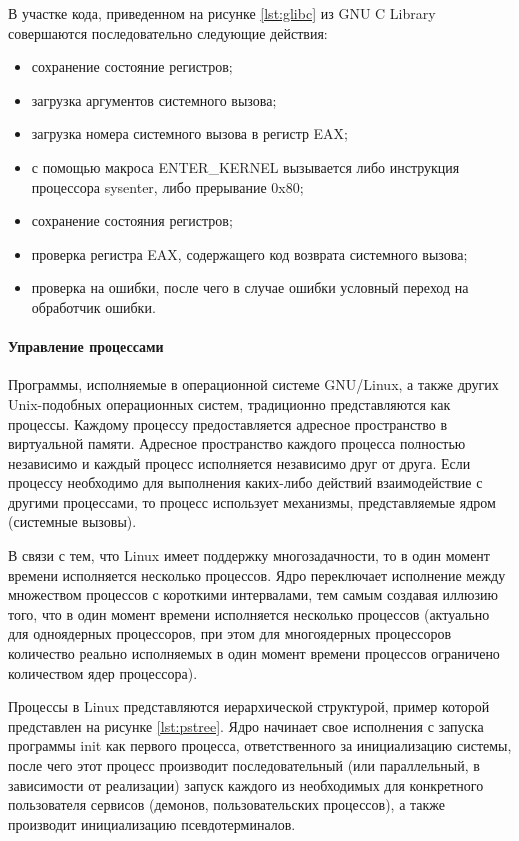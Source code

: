 \documentclass{gost7.32-2001}
\begin{document}
В участке кода, приведенном на рисунке \ref{lst:glibc} из GNU C
Library совершаются последовательно следующие действия:
\begin{itemize}
\item
  сохранение состояние регистров;
\item
  загрузка аргументов системного вызова;
\item
  загрузка номера системного вызова в регистр EAX;
\item
  с помощью макроса ENTER\_KERNEL вызывается либо инструкция процессора sysenter, либо прерывание
  0x80;
\item
  сохранение состояния регистров;
\item
  проверка регистра EAX, содержащего код возврата системного вызова;
\item
  проверка на ошибки, после чего в случае ошибки условный переход на
  обработчик ошибки.
\end{itemize}

\paragraph{Управление процессами}

Программы, исполняемые в
операционной системе GNU/Linux, а также других Unix-подобных
операционных систем, традиционно представляются как процессы. Каждому
процессу предоставляется адресное пространство в виртуальной
памяти. Адресное пространство каждого процесса полностью независимо и
каждый процесс исполняется независимо друг от друга. Если процессу
необходимо для выполнения каких-либо действий взаимодействие с другими
процессами, то процесс использует механизмы, представляемые ядром
(системные вызовы).

В связи с тем, что Linux имеет поддержку многозадачности, то в один
момент времени исполняется несколько процессов. Ядро переключает
исполнение между множеством процессов с короткими интервалами, тем
самым создавая иллюзию того, что в один момент времени исполняется
несколько процессов (актуально для одноядерных процессоров, при этом
для многоядерных процессоров количество реально исполняемых в один
момент времени процессов ограничено количеством ядер процессора).

Процессы в Linux представляются иерархической структурой, пример
которой представлен на рисунке \ref{lst:pstree}. Ядро начинает свое
исполнения с запуска программы init как первого процесса,
ответственного за инициализацию системы, после чего этот процесс
производит последовательный (или параллельный, в зависимости от
реализации) запуск каждого из необходимых для конкретного пользователя
сервисов (демонов, пользовательских процессов), а также производит
инициализацию псевдотерминалов.
\end{document}
